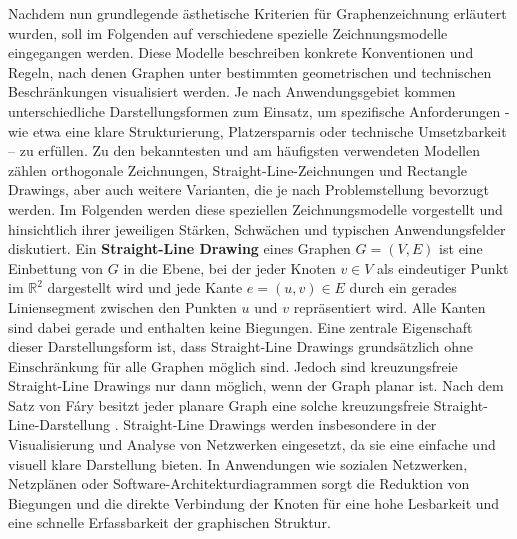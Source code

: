 \documentclass[bachelor, german]{algothesis}
\begin{document}
Nachdem nun grundlegende ästhetische Kriterien für Graphenzeichnung erläutert wurden, soll im Folgenden auf verschiedene spezielle Zeichnungsmodelle eingegangen werden. Diese Modelle beschreiben konkrete Konventionen und Regeln, nach denen Graphen unter bestimmten geometrischen und technischen Beschränkungen visualisiert werden.\newline
Je nach Anwendungsgebiet kommen unterschiedliche Darstellungsformen zum Einsatz, um spezifische Anforderungen - wie etwa eine klare Strukturierung, Platzersparnis oder technische Umsetzbarkeit – zu erfüllen. Zu den bekanntesten und am häufigsten verwendeten Modellen zählen orthogonale Zeichnungen, Straight-Line-Zeichnungen und Rectangle Drawings, aber auch weitere Varianten, die je nach Problemstellung bevorzugt werden.
Im Folgenden werden diese speziellen Zeichnungsmodelle vorgestellt und hinsichtlich ihrer jeweiligen Stärken, Schwächen und typischen Anwendungsfelder diskutiert\cite{Handbook}.\newline \newline
Ein \textbf{Straight-Line Drawing}  eines Graphen $G = (V,E)$ ist eine Einbettung von $G$ in die Ebene, bei der jeder Knoten $v \in V$ als eindeutiger Punkt im $\mathbb{R}^2$ dargestellt wird und jede Kante $e = (u,v) \in E$ durch ein gerades Liniensegment zwischen den Punkten $u$ und $v$ repräsentiert wird. Alle Kanten sind dabei gerade und enthalten keine Biegungen.\newline
Eine zentrale Eigenschaft dieser Darstellungsform ist, dass Straight-Line Drawings grundsätzlich ohne Einschränkung für alle Graphen möglich sind. Jedoch sind kreuzungsfreie Straight-Line Drawings nur dann möglich, wenn der Graph planar ist. Nach dem Satz von Fáry besitzt jeder planare Graph eine solche kreuzungsfreie Straight-Line-Darstellung \cite{Bläsius}.\newline
Straight-Line Drawings werden insbesondere in der Visualisierung und Analyse von Netzwerken eingesetzt, da sie eine einfache und visuell klare Darstellung bieten. In Anwendungen wie sozialen Netzwerken, Netzplänen oder Software-Architekturdiagrammen sorgt die Reduktion von Biegungen und die direkte Verbindung der Knoten für eine hohe Lesbarkeit und eine schnelle Erfassbarkeit der graphischen Struktur.\newline
\end{document}
